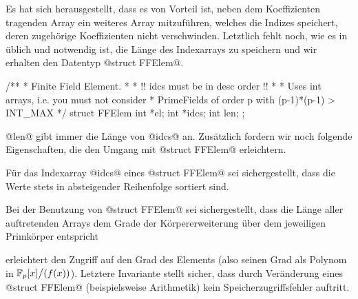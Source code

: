 Es hat sich herausgestellt, dass es von Vorteil ist, neben dem Koeffizienten
tragenden Array ein weiteres Array mitzuführen, welches die
Indizes speichert, deren zugehörige Koeffizienten nicht verschwinden. Letztlich
fehlt noch, wie es in \Clang üblich und notwendig ist, die Länge des
Indexarrays zu speichern und wir erhalten den Datentyp @struct FFElem@.

\begin{ccode}[caption={Aus \url{../Sage/enumeratePCNs.c}},
  firstnumber=15]
/**
 * Finite Field Element. 
 * 
 * !! idcs must be in desc order !!
 *
 * Uses int arrays, i.e. you must not consider 
 * PrimeFields of order p with  (p-1)*(p-1) > INT_MAX
 */
struct FFElem{
    int *el;
    int *idcs;
    int len;
};
\end{ccode}

@len@ gibt immer die Länge von @idcs@ an. Zusätzlich fordern wir noch folgende
Eigenschaften, die den Umgang mit @struct FFElem@ erleichtern.

\begin{invariante}
  \label{invariante:desc_order}
  Für das Indexarray @idcs@ eines @struct FFElem@ sei sichergestellt, 
  dass die Werte stets in absteigender Reihenfolge sortiert sind. 
\end{invariante}

\begin{invariante}
  \label{invariante:array_len}
  Bei der Benutzung von @struct FFElem@ sei sichergestellt, 
  dass die Länge aller auftretenden Arrays dem Grade der 
  Körpererweiterung über dem jeweiligen Primkörper entspricht
\end{invariante}

 erleichtert den Zugriff auf
den Grad des Elements (also seinen Grad als Polynom in
$\mathbb{F}_p[x]\big/(f(x))$). Letztere Invariante stellt sicher, dass durch
Veränderung eines @struct FFElem@ (beispielsweise Arithmetik) kein 
Speicherzugriffsfehler auftritt.

